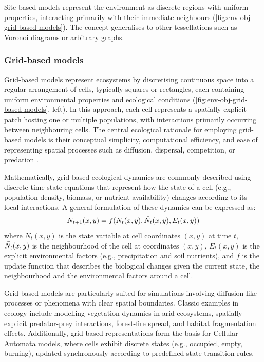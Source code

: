 Site-based models represent the environment as discrete regions with uniform properties, interacting primarily with their immediate neighbours (\cref{fig:env-obj-grid-based-models}). The concept generalises to other tessellations such as Voronoi diagrams or arbitrary graphs.

\subsubsection{Grid-based models}

Grid-based models represent ecosystems by discretising continuous space into a regular arrangement of cells, typically squares or rectangles, each containing uniform environmental properties and ecological conditions (\cref{fig:env-obj-grid-based-models}, left). In this approach, each cell represents a spatially explicit patch hosting one or multiple populations, with interactions primarily occurring between neighbouring cells. The central ecological rationale for employing grid-based models is their conceptual simplicity, computational efficiency, and ease of representing spatial processes such as diffusion, dispersal, competition, or predation \cite{Grimm2005,Cantrell2010,Nelson2012}.

Mathematically, grid-based ecological dynamics are commonly described using discrete-time state equations that represent how the state of a cell (e.g., population density, biomass, or nutrient availability) changes according to its local interactions. A general formulation of these dynamics can be expressed as:
\begin{align}
    N_{t+1}(x,y) = f(N_t(x,y), \Bar{N_t}(x, y), E_t(x, y))
\end{align}
where $N_t(x, y)$ is the state variable at cell coordinates $(x, y)$ at time $t$, $\Bar{N_t}(x, y)$ is the neighbourhood of the cell at coordinates $(x, y)$, $E_t(x, y)$ is the explicit environmental factors (e.g., precipitation and soil nutrients), and $f$ is the update function that describes the biological changes given the current state, the neighbourhood and the environmental factors around a cell.

Grid-based models are particularly suited for simulations involving diffusion-like processes or phenomena with clear spatial boundaries. Classic examples in ecology include modelling vegetation dynamics in arid ecosystems, spatially explicit predator-prey interactions, forest-fire spread, and habitat fragmentation effects. Additionally, grid-based representations form the basis for Cellular Automata models, where cells exhibit discrete states (e.g., occupied, empty, burning), updated synchronously according to predefined state-transition rules.

